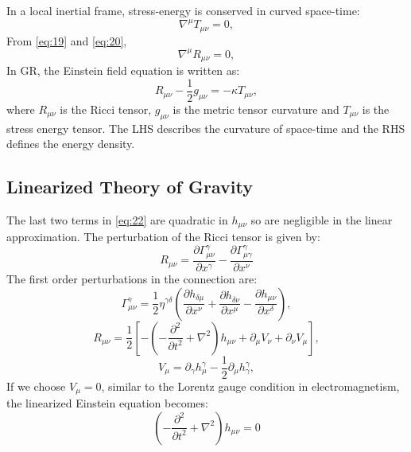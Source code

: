 \documentclass{ttuthes2007}
\begin{document}
In a local inertial frame, stress-energy is conserved in curved
space-time:
\begin{equation} \label{eq:20}
\nabla ^\mu T_{\mu \nu} =0,
\end{equation}
From \ref{eq:19} and \ref{eq:20},
\begin{equation}
\nabla ^\mu R_{\mu \nu} =0,
\end{equation}
In \ac{GR}, the Einstein field equation is written as:
\begin{equation}
R_{\mu\nu} -\frac{1}{2}g_{\mu\nu}=-\kappa T_{\mu\nu},
\end{equation}	
where $R_{\mu\nu}$ is the Ricci tensor, $g_{\mu\nu}$ is the metric tensor
curvature and $T_{\mu\nu}$ is the stress energy tensor. The LHS describes the
curvature of space-time and the RHS defines the energy density.\\

\subsection{Linearized Theory of Gravity}
The last two terms in \ref{eq:22} are quadratic in $h_{\mu \nu}$ so are negligible
in the linear approximation. The perturbation of the Ricci tensor is given by:
\begin{equation} \label{eq:23}
R_{\mu \nu} = \frac{\partial\Gamma ^\gamma _{\mu \nu}}{\partial 
x^\gamma} - \frac{\partial\Gamma ^\gamma _{\mu \gamma}}{\partial x^\nu}
\end{equation}
The first order perturbations in the connection are:
\begin{equation} \label{eq:24}
\Gamma ^\gamma _{\mu \nu}= \frac{1}{2} \eta^{\gamma \delta}\left(\frac{\partial
h_{\delta \mu }}{\partial x^\nu} + \frac{\partial h_{\delta \nu }}{\partial
x^\mu} -\frac{\partial  h_{\mu \nu }}{\partial x^\delta}\right),
\end{equation}
\begin{equation} \label{eq:25}
R_{\mu \nu} = \frac{1}{2}\left[ -\left(-\frac{\partial^2}{\partial
t^2}+\nabla ^2\right)h_{\mu\nu} + \partial_\mu V_\nu + \partial_\nu V_\mu
\right],
\end{equation}
\begin{equation} \label{eq:26}
V_\mu = \partial_\gamma h^\gamma_\mu - \frac{1}{2}\partial_\mu h^\gamma_\gamma,
\end{equation}
	If we choose $V_\mu=0$, similar to the Lorentz gauge condition in
electromagnetism, the linearized Einstein equation becomes:
\begin{equation} \label{eq:27}
\left(-\frac{\partial^2}{\partial t^2}+\nabla ^2\right)h_{\mu\nu} = 0 
\end{equation}
\end{document}
